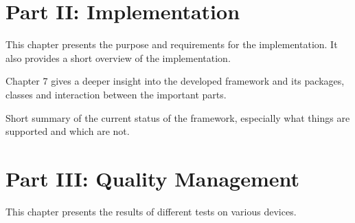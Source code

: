 \section*{Part II: Implementation}

  \vspace{1mm}

\noindent  This chapter presents the purpose and requirements for the implementation. It also provides a short overview of the implementation. \\

  \vspace{1mm}

\noindent  Chapter 7 gives a deeper insight into the developed framework and its packages, classes and interaction between the important parts. \\

  \vspace{1mm}

\noindent  Short summary of the current status of the framework, especially what things are supported and which are not. \\

\section*{Part III: Quality Management}

  \vspace{1mm}

\noindent  This chapter presents the results of different tests on various devices. \\
